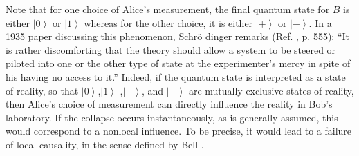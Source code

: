 \documentclass[pra,twocolumn,nofootinbib,showpacs]{revtex4}
\begin{document}
Note that for one choice of Alice's measurement, the final quantum state for
$B$ is either $\left| 0\right\rangle $ or $\left| 1\right\rangle $ whereas
for the other choice, it is either $\left| +\right\rangle $ or $\left|
-\right\rangle .$ In a 1935 paper discussing this phenomenon, Schr\"{o}%
dinger remarks (Ref. \cite{Schroedinger}, p. 555): ``It is rather
discomforting that the theory should allow a system to be steered or piloted
into one or the other type of state at the experimenter's mercy in spite of
his having no access to it.'' Indeed, if the quantum state is interpreted as
a state of reality, so that $\left| 0\right\rangle $,$\left| 1\right\rangle $%
,$\left| +\right\rangle $, and $\left| -\right\rangle $ are mutually
exclusive states of reality, then Alice's choice of measurement can directly
influence the reality in Bob's laboratory. If the collapse occurs
instantaneously, as is generally assumed, this would correspond to a
nonlocal influence. To be precise, it would lead to a failure of local
causality, in the sense defined by Bell \cite{Belllocalbeables}.
\end{document}
